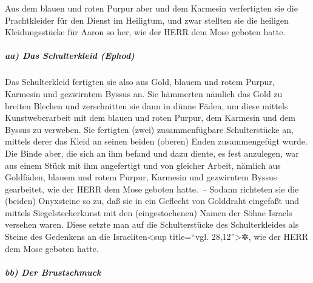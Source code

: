  Aus dem blauen und roten Purpur aber und dem Karmesin
verfertigten sie die Prachtkleider für den Dienst im Heiligtum, und zwar
stellten sie die heiligen Kleidungsstücke für Aaron so her, wie der HERR
dem Mose geboten hatte.

\hypertarget{aa-das-schulterkleid-ephod}{%
\subparagraph{aa) Das Schulterkleid
(Ephod)}\label{aa-das-schulterkleid-ephod}}

 Das Schulterkleid fertigten sie also aus Gold, blauem und
rotem Purpur, Karmesin und gezwirntem Byssus an.  Sie
hämmerten nämlich das Gold zu breiten Blechen und zerschnitten sie dann
in dünne Fäden, um diese mittels Kunstweberarbeit mit dem blauen und
roten Purpur, dem Karmesin und dem Byssus zu verweben. 
Sie fertigten (zwei) zusammenfügbare Schulterstücke an, mittels derer
das Kleid an seinen beiden (oberen) Enden zusammengefügt wurde.
 Die Binde aber, die sich an ihm befand und dazu diente,
es fest anzulegen, war aus einem Stück mit ihm angefertigt und von
gleicher Arbeit, nämlich aus Goldfäden, blauem und rotem Purpur,
Karmesin und gezwirntem Byssus gearbeitet, wie der HERR dem Mose geboten
hatte.~--  Sodann richteten sie die (beiden) Onyxsteine so
zu, daß sie in ein Geflecht von Golddraht eingefaßt und mittels
Siegelstecherkunst mit den (eingestochenen) Namen der Söhne Israels
versehen waren.  Diese setzte man auf die Schulterstücke
des Schulterkleides als Steine des Gedenkens an die
Israeliten\textless sup title=``vgl. 28,12''\textgreater✲, wie der HERR
dem Mose geboten hatte.

\hypertarget{bb-der-brustschmuck}{%
\subparagraph{bb) Der Brustschmuck}\label{bb-der-brustschmuck}}

